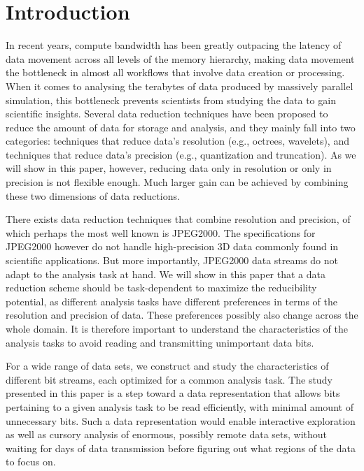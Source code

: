 \section{Introduction}

In recent years, compute bandwidth has been greatly outpacing the latency of data movement across all levels of the memory hierarchy, making data movement the bottleneck in almost all workflows that involve data creation or processing. When it comes to analysing the terabytes of data produced by massively parallel simulation, this bottleneck prevents scientists from studying the data to gain scientific insights. Several data reduction techniques have been proposed to reduce the amount of data for storage and analysis, and they mainly fall into two categories: techniques that reduce data's resolution (e.g., octrees, wavelets), and techniques that reduce data's precision (e.g., quantization and truncation). As we will show in this paper, however, reducing data only in resolution or only in precision is not flexible enough. Much larger gain can be achieved by combining these two dimensions of data reductions. 

There exists data reduction techniques that combine resolution and precision, of which perhaps the most well known is JPEG2000. The specifications for JPEG2000 however do not handle high-precision 3D data commonly found in scientific applications. But more importantly, JPEG2000 data streams do not adapt to the analysis task at hand. We will show in this paper that a data reduction scheme should be task-dependent to maximize the reducibility potential, as different analysis tasks have different preferences in terms of the resolution and precision of data. These preferences possibly also change across the whole domain. It is therefore important to understand the characteristics of the analysis tasks to avoid reading and transmitting unimportant data bits.

For a wide range of data sets, we construct and study the characteristics of different bit streams, each optimized for a common analysis task. The study presented in this paper is a step toward a data representation that allows bits pertaining to a given analysis task to be read efficiently, with minimal amount of unnecessary bits. Such a data representation would enable interactive exploration as well as cursory analysis of enormous, possibly remote data sets, without waiting for days of data transmission before figuring out what regions of the data to focus on.


